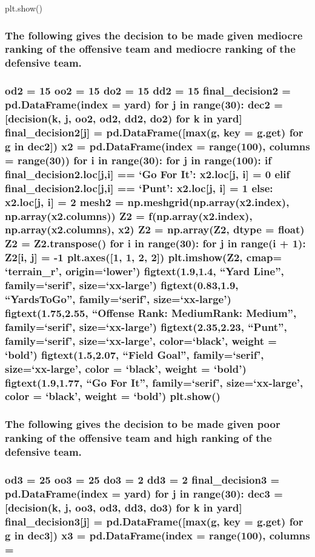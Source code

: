 \documentclass[letterpaper,10pt,english]{/anaconda/lib/python2.7/site-packages/sphinx/texinputs/sphinxhowto}
\begin{document}
{plt.show()}\subsubsection{The following gives the decision to be made given mediocre ranking of
the offensive team and mediocre ranking of the defensive team.}\subsubsection{od2 = 15 oo2 = 15 do2 = 15 dd2 = 15 final\_decision2 =
pd.DataFrame(index = yard) for j in range(30): dec2 = {[}decision(k, j,
oo2, od2, dd2, do2) for k in yard{]} final\_decision2{[}j{]} =
pd.DataFrame({[}max(g, key = g.get) for g in dec2{]}) x2 =
pd.DataFrame(index = range(100), columns = range(30)) for i in
range(30): for j in range(100): if final\_decision2.loc{[}j,i{]} == `Go
For It': x2.loc{[}j, i{]} = 0 elif final\_decision2.loc{[}j,i{]} ==
`Punt': x2.loc{[}j, i{]} = 1 else: x2.loc{[}j, i{]} = 2 mesh2 =
np.meshgrid(np.array(x2.index), np.array(x2.columns)) Z2 =
f(np.array(x2.index), np.array(x2.columns), x2) Z2 = np.array(Z2, dtype
= float) Z2 = Z2.transpose() for i in range(30): for j in range(i + 1):
Z2{[}i, j{]} = -1 plt.axes({[}1, 1, 2, 2{]}) plt.imshow(Z2, cmap=
`terrain\_r', origin=`lower') figtext(1.9,1.4, ``Yard Line'',
family=`serif', size=`xx-large') figtext(0.83,1.9,
``Yards\n  To\n  Go'', family=`serif', size=`xx-large')
figtext(1.75,2.55, ``Offense Rank: Medium\nDefense Rank: Medium'',
family=`serif', size=`xx-large') figtext(2.35,2.23, ``Punt'',
family=`serif', size=`xx-large', color=`black', weight = `bold')
figtext(1.5,2.07, ``Field Goal'', family=`serif', size=`xx-large', color
= `black', weight = `bold') figtext(1.9,1.77, ``Go For It'',
family=`serif', size=`xx-large', color = `black', weight = `bold')
plt.show()}\subsubsection{The following gives the decision to be made given poor ranking of the
offensive team and high ranking of the defensive team.}\subsubsection{od3 = 25 oo3 = 25 do3 = 2 dd3 = 2 final\_decision3 = pd.DataFrame(index
= yard) for j in range(30): dec3 = {[}decision(k, j, oo3, od3, dd3, do3)
for k in yard{]} final\_decision3{[}j{]} = pd.DataFrame({[}max(g, key =
g.get) for g in dec3{]}) x3 = pd.DataFrame(index = range(100), columns =
}
\end{document}
